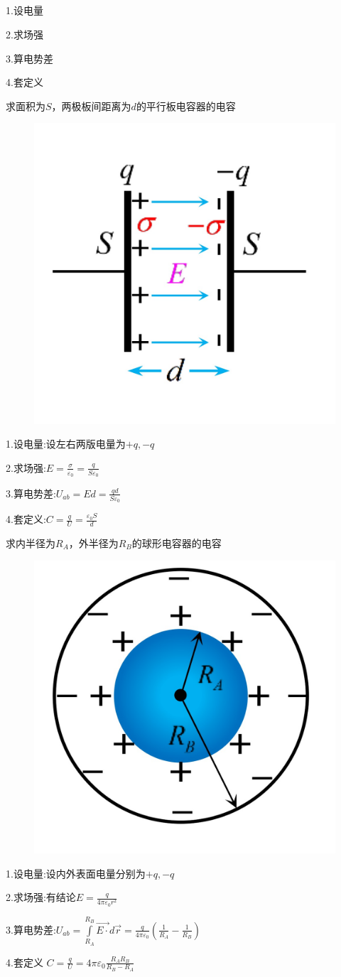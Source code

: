 \documentclass[lang=cn,10pt]{elegantbook}
\begin{document}
		\subsection{\color{red}}	
		\begin{note}
			1.设电量
			
			2.求场强
			
			3.算电势差
			
			4.套定义
		\end{note}	
		\begin{example}
			求面积为$S$，两极板间距离为$d$的平行板电容器的电容
			
\begin{figure}[H]
	\centering
	\includegraphics[width=0.18\linewidth]{image/IMG_0420(20231118-140226)}
	\caption{}
	\label{fig:img042020231118-140226}
\end{figure}
		\end{example}
		\begin{solution}
			
			1.设电量:设左右两版电量为$+q,-q$
			
			2.求场强:$E=\frac{\sigma}{\varepsilon_{0}}=\frac{q}{S\varepsilon_{0}}$
			
			3.算电势差:$U_{ab}=Ed=\frac{qd}{S\varepsilon_{0}}$
			
			4.套定义:$C=\frac{q}{U}=\frac{\varepsilon_{0}S}{d}$
		\end{solution}
		\begin{example}
			求内半径为$R_{A}$，外半径为$R_{B}$的球形电容器的电容
\begin{figure}[H]
	\centering
	\includegraphics[width=0.18\linewidth]{image/IMG_0422(20231118-140244)}
	\caption{}
	\label{fig:img042220231118-140244}
\end{figure}
		\end{example}
		\begin{solution}
			1.设电量:设内外表面电量分别为$+q,-q$
			
			2.求场强:有结论$E=\frac{q}{4\pi \varepsilon_{0}r^{2}}$
			
			3.算电势差:$U_{ab}=\int\limits_{R_A}^{R_B}{\overrightarrow{E\cdot }d\overrightarrow{r}}=\frac{q}{4\pi \varepsilon _0}\left( \frac{1}{R_A}-\frac{1}{R_B} \right) $
			
			4.套定义
			$C=\frac{q}{U}=4\pi \varepsilon _0\frac{R_AR_B}{R_B-R_A}$
		\end{solution}
\end{document}
